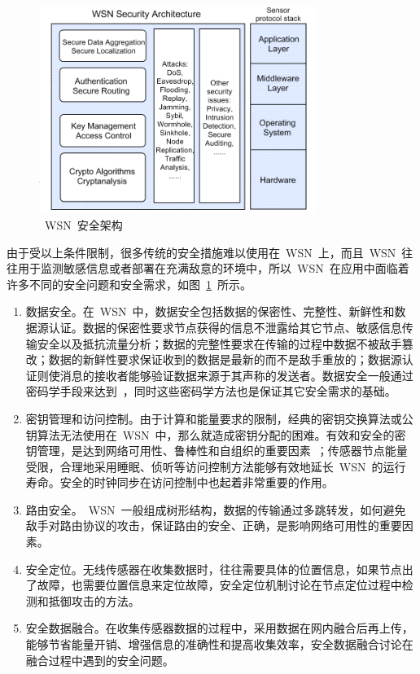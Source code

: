 \documentclass[a4paper,10pt]{article}
\begin{document}
\begin{figure}[htbp]
  \centering
  \includegraphics[width=0.8\textwidth,keepaspectratio]{wsn_sec_map}
  \caption{\label{wsn_sec_map}~WSN~安全架构~\cite{Li2005}}
\end{figure}

由于受以上条件限制，很多传统的安全措施难以使用在~WSN~上，而且~WSN~往往用于监测敏感信息或者部署在充满敌意的环境中，所以~WSN~在应用中面临着许多不同的安全问题和安全需求，如图~\ref{wsn_sec_map}~所示。

\begin{enumerate}

\item 数据安全。在~WSN~中，数据安全包括数据的保密性、完整性、新鲜性和数据源认证。数据的保密性要求节点获得的信息不泄露给其它节点、敏感信息传输安全以及抵抗流量分析；数据的完整性要求在传输的过程中数据不被敌手篡改；数据的新鲜性要求保证收到的数据是最新的而不是敌手重放的；数据源认证则使消息的接收者能够验证数据来源于其声称的发送者。数据安全一般通过密码学手段来达到~\cite{Perrig2002}，同时这些密码学方法也是保证其它安全需求的基础。

\item 密钥管理和访问控制。由于计算和能量要求的限制，经典的密钥交换算法或公钥算法无法使用在~WSN~中，那么就造成密钥分配的困难。有效和安全的密钥管理，是达到网络可用性、鲁棒性和自组织的重要因素~\cite{Lee2007}；传感器节点能量受限，合理地采用睡眠、侦听等访问控制方法能够有效地延长~WSN~的运行寿命。安全的时钟同步在访问控制中也起着非常重要的作用。

\item 路由安全。~WSN~一般组成树形结构，数据的传输通过多跳转发，如何避免敌手对路由协议的攻击，保证路由的安全、正确，是影响网络可用性的重要因素。

\item 安全定位。无线传感器在收集数据时，往往需要具体的位置信息，如果节点出了故障，也需要位置信息来定位故障，安全定位机制讨论在节点定位过程中检测和抵御攻击的方法。

\item 安全数据融合。在收集传感器数据的过程中，采用数据在网内融合后再上传，能够节省能量开销、增强信息的准确性和提高收集效率，安全数据融合讨论在融合过程中遇到的安全问题。

\end{enumerate}
\end{document}
